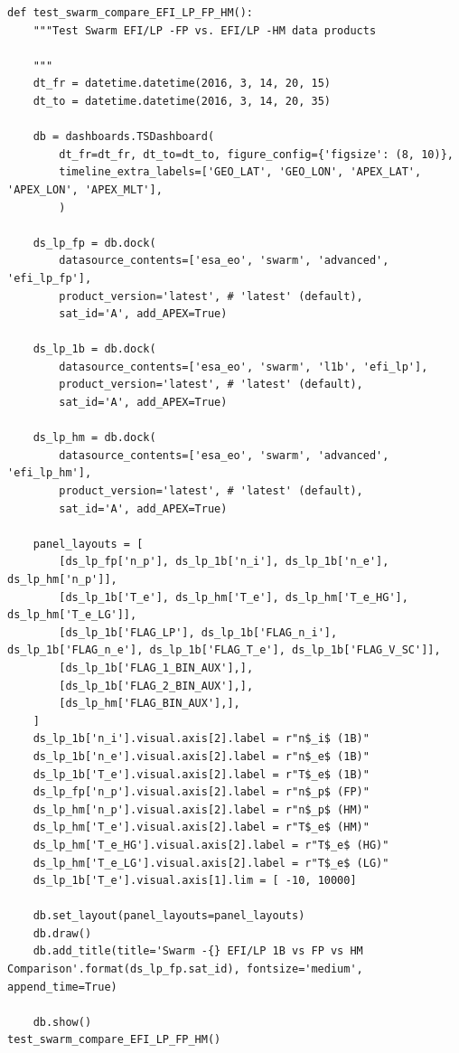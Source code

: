 \begin{verbatim}
def test_swarm_compare_EFI_LP_FP_HM():
    """Test Swarm EFI/LP -FP vs. EFI/LP -HM data products
    
    """
    dt_fr = datetime.datetime(2016, 3, 14, 20, 15)
    dt_to = datetime.datetime(2016, 3, 14, 20, 35)

    db = dashboards.TSDashboard(
        dt_fr=dt_fr, dt_to=dt_to, figure_config={'figsize': (8, 10)},
        timeline_extra_labels=['GEO_LAT', 'GEO_LON', 'APEX_LAT', 'APEX_LON', 'APEX_MLT'],
        )

    ds_lp_fp = db.dock(
        datasource_contents=['esa_eo', 'swarm', 'advanced', 'efi_lp_fp'], 
        product_version='latest', # 'latest' (default),
        sat_id='A', add_APEX=True)
    
    ds_lp_1b = db.dock(
        datasource_contents=['esa_eo', 'swarm', 'l1b', 'efi_lp'], 
        product_version='latest', # 'latest' (default),
        sat_id='A', add_APEX=True)
    
    ds_lp_hm = db.dock(
        datasource_contents=['esa_eo', 'swarm', 'advanced', 'efi_lp_hm'], 
        product_version='latest', # 'latest' (default),
        sat_id='A', add_APEX=True)
    
    panel_layouts = [
        [ds_lp_fp['n_p'], ds_lp_1b['n_i'], ds_lp_1b['n_e'], ds_lp_hm['n_p']],
        [ds_lp_1b['T_e'], ds_lp_hm['T_e'], ds_lp_hm['T_e_HG'], ds_lp_hm['T_e_LG']],
        [ds_lp_1b['FLAG_LP'], ds_lp_1b['FLAG_n_i'], ds_lp_1b['FLAG_n_e'], ds_lp_1b['FLAG_T_e'], ds_lp_1b['FLAG_V_SC']],
        [ds_lp_1b['FLAG_1_BIN_AUX'],],
        [ds_lp_1b['FLAG_2_BIN_AUX'],],
        [ds_lp_hm['FLAG_BIN_AUX'],],
    ]
    ds_lp_1b['n_i'].visual.axis[2].label = r"n$_i$ (1B)"
    ds_lp_1b['n_e'].visual.axis[2].label = r"n$_e$ (1B)"
    ds_lp_1b['T_e'].visual.axis[2].label = r"T$_e$ (1B)"
    ds_lp_fp['n_p'].visual.axis[2].label = r"n$_p$ (FP)"
    ds_lp_hm['n_p'].visual.axis[2].label = r"n$_p$ (HM)"
    ds_lp_hm['T_e'].visual.axis[2].label = r"T$_e$ (HM)"
    ds_lp_hm['T_e_HG'].visual.axis[2].label = r"T$_e$ (HG)"
    ds_lp_hm['T_e_LG'].visual.axis[2].label = r"T$_e$ (LG)"
    ds_lp_1b['T_e'].visual.axis[1].lim = [ -10, 10000]
    
    db.set_layout(panel_layouts=panel_layouts)
    db.draw()
    db.add_title(title='Swarm -{} EFI/LP 1B vs FP vs HM Comparison'.format(ds_lp_fp.sat_id), fontsize='medium', append_time=True)

    db.show()
test_swarm_compare_EFI_LP_FP_HM()
\end{verbatim}

